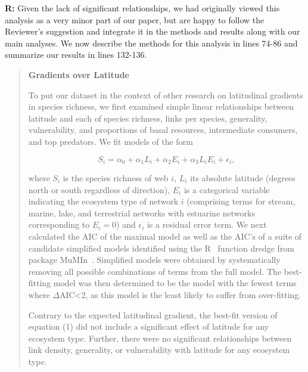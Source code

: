 \documentclass[12pt]{letter}
\begin{document}
  \textbf{R:} Given the lack of significant relationships,
  we had originally viewed this analysis as a very minor 
  part of our paper, but are happy to follow the Reviewer's 
  suggestion and integrate it in the methods and
  results along with our main analyses. We now describe 
  the methods for this analysis in lines 74-86 and 
  summarize our results in lines 132-136.


  \begin{quotation}

    \textbf{Gradients over Latitude}

    To put our dataset in the context of other research on latitudinal gradients in species richness,
    we first examined simple linear relationships between latitude and each of 
    species richness, links per species, generality, vulnerability, and proportions
    of basal resources, intermediate consumers, and top predators. We fit models of the form

    \begin{equation}
    \label{Latfull}
    S_{i} = \alpha_{0} + \alpha_{1} L_{i} + \alpha_{2} E_{i} + \alpha_{3} L_{i} E_{i} + \epsilon_{i} ,
    \end{equation}

    \noindent where $S_{i}$ is the species richness of web $i$, $L_{i}$ its absolute
    latitude (degrees north or south  regardless of direction), $E_{i}$ is a categorical
    variable indicating the ecosystem type of network $i$ (comprising terms for stream, 
    marine, lake, and terrestrial networks with estuarine
    networks corresponding to $E_{i}=0$) and $\epsilon_{i}$ is a residual error term. 
    We next calculated the AIC
    of the maximal model as well as the AIC's of a suite of candidate simplified models identified
    using the R~\cite{R} function dredge from package MuMIn~\cite{MuMIn}. 
    Simplified models were obtained by
    systematically removing all possible combinations of terms from the full model.
    The best-fitting model was then determined to be the model with the fewest terms 
    where $\Delta$AIC\textless2, as this model is the least likely to suffer from over-fitting. 


    \smallskip

    Contrary to the expected latitudinal gradient, the 
    best-fit version of equation (1) did not include a 
    significant effect of latitude for any ecosystem type. 
    Further, there were no significant relationships 
    between link density, generality, or vulnerability with
    latitude for any ecosystem type.

  \end{quotation}
\end{document}
